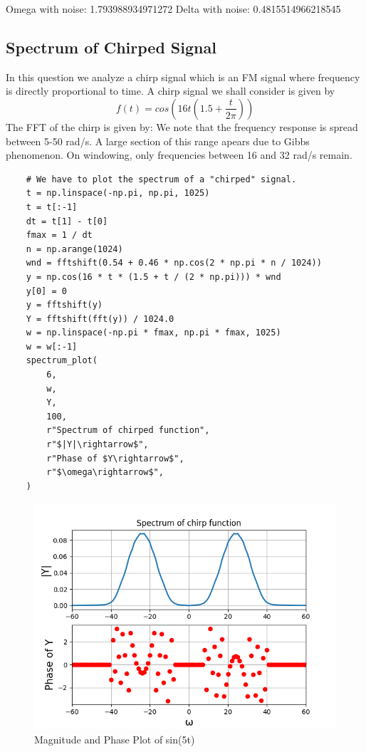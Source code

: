 \documentclass{article}
\begin{document}
\newline
Omega with noise:  1.793988934971272\newline
Delta with noise:   0.4815514966218545

\subsection{Spectrum of Chirped Signal}
In this question we analyze a chirp signal which is an FM signal where frequency is directly proportional to time.
A chirp signal we shall consider is given by 
\begin{equation}
    f(t) = cos(16t(1.5 + \frac{t}{2\pi}))
\end{equation}
The FFT of the chirp is given by:
We note that the frequency response is spread between 5-50 rad/s. A large section of this range apears due to Gibbs phenomenon. On windowing, only frequencies between 16 and 32 rad/s remain.

\begin{verbatim}
    # We have to plot the spectrum of a "chirped" signal.
    t = np.linspace(-np.pi, np.pi, 1025)
    t = t[:-1]
    dt = t[1] - t[0]
    fmax = 1 / dt
    n = np.arange(1024)
    wnd = fftshift(0.54 + 0.46 * np.cos(2 * np.pi * n / 1024))
    y = np.cos(16 * t * (1.5 + t / (2 * np.pi))) * wnd
    y[0] = 0
    y = fftshift(y)
    Y = fftshift(fft(y)) / 1024.0
    w = np.linspace(-np.pi * fmax, np.pi * fmax, 1025)
    w = w[:-1]
    spectrum_plot(
        6,
        w,
        Y,
        100,
        r"Spectrum of chirped function",
        r"$|Y|\rightarrow$",
        r"Phase of $Y\rightarrow$",
        r"$\omega\rightarrow$",
    )
\end{verbatim}
\begin{figure}[!ht]
  \centering
  \includegraphics[scale=0.6]{Figure_11.png}
  \caption{Magnitude and Phase Plot of sin(5t)}
  \label{fig:sample}
  \end{figure}
  
\end{document}
